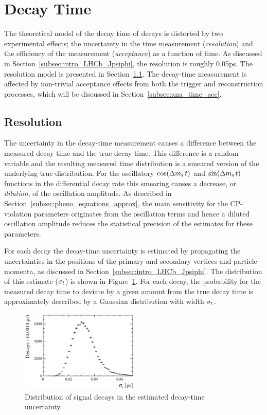\section{Decay Time}
\label{sec:ana_time}

The theoretical model of the decay time of \BstoJpsiKK{} decays is distorted by two experimental effects; the uncertainty in the time
measurement (\emph{resolution}) and the efficiency of the measurement (\emph{acceptance}) as a function of time. As discussed in
Section~\ref{subsec:intro_LHCb_Jpsiphi}, the resolution is roughly 0.05\unitsp{}ps. The resolution model is presented in
Section~\ref{subsec:ana_time_res}. The decay-time measurement is affected by non-trivial acceptance effects from both the trigger and
reconstruction processes, which will be discussed in Section~\ref{subsec:ana_time_acc}.


\subsection{Resolution}
\label{subsec:ana_time_res}

The uncertainty in the decay-time measurement causes a difference between the measured decay time and the true decay time. This difference
is a random variable and the resulting measured time distribution is a smeared version of the underlying true distribution. For the
oscillatory $\cos\!\left(\Delta m_\text{s}\, t\right)$ and $\sin\!\left(\Delta m_\text{s}\, t\right)$ functions in the differential decay rate this smearing causes a decrease, or \emph{dilution}, of the
oscillation amplitude. As described in Section~\ref{subsec:pheno_equations_approx}, the main sensitivity for the CP-violation parameters
originates from the oscillation terms and hence a diluted oscillation amplitude reduces the statistical precision of the estimates for
these parameters.

For each decay the decay-time uncertainty is estimated by propagating the uncertainties in the positions of the primary and secondary
vertices and particle momenta, as discussed in Section~\ref{subsec:intro_LHCb_Jpsiphi}. The distribution of this estimate ($\sigma_t$) is
shown in Figure~\ref{fig:sigmat}. For each decay, the probability for the measured decay time to deviate by a given amount from the true
decay time is approximately described by a Gaussian distribution with width $\sigma_t$.
\begin{figure}[htbp]
  \centering
  \includegraphics[width=0.5\textwidth]{graphics/analysis/sigmat}
  \caption{Distribution of \BstoJpsiKK{} signal decays in the estimated decay-time uncertainty.}
  \label{fig:sigmat}
\end{figure}

